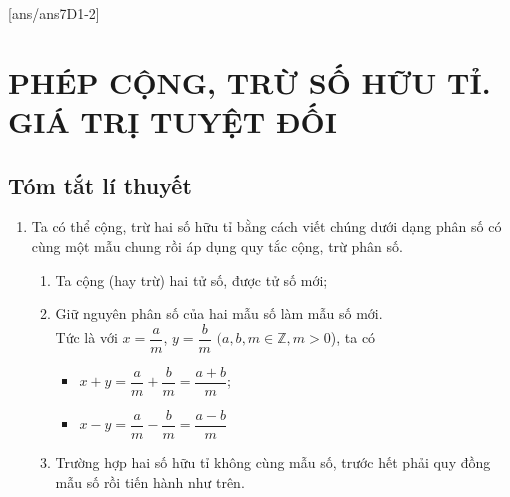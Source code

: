 [ans/ans7D1-2]
\section{PHÉP CỘNG, TRỪ SỐ HỮU TỈ. GIÁ TRỊ TUYỆT ĐỐI}
\subsection{Tóm tắt lí thuyết}
\begin{enumerate}[1)]
\item Ta có thể cộng, trừ hai số hữu tỉ bằng cách viết chúng dưới dạng phân số có cùng một mẫu chung rồi áp dụng quy tắc cộng, trừ phân số.

\begin{enumerate}[\tickEX]
	\item Ta cộng (hay trừ) hai tử số, được tử số mới;
	\item Giữ nguyên phân số của hai mẫu số làm mẫu số mới.\\
	Tức là với $x=\dfrac{a}{m}$, $y=\dfrac{b}{m}$ $(a,b,m\in\mathbb{Z}, m>0$), ta có
	\begin{itemize}
		\item $x+y=\dfrac{a}{m}+\dfrac{b}{m}=\dfrac{a+b}{m}$;
		\item $x-y=\dfrac{a}{m}-\dfrac{b}{m}=\dfrac{a-b}{m}$
	\end{itemize}

	\item Trường hợp hai số hữu tỉ không cùng mẫu số, trước hết phải quy đồng mẫu số rồi tiến hành như trên.



\end{enumerate}
\end{enumerate}
